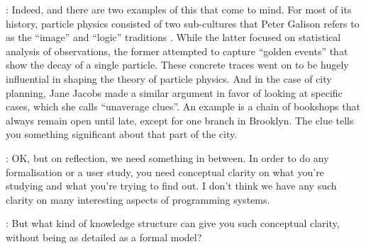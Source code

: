 \documentclass[runningheads]{llncs}
\newcommand{\T}{Tomas}
\newcommand{\J}{Joel}
\newcommand{\says}[2][gg]{\vspace{0.5em}\noindent\hangindent=0.5cm{\textsc{#1}}: #2}
\begin{document}
\says[\T]{Indeed, and there are two examples of this that come to mind. For most of its history, particle physics consisted of two sub-cultures that Peter Galison refers to as the ``image'' and ``logic'' traditions \cite{galison-1997-image}. While the latter focused on statistical analysis of observations, the former attempted to capture ``golden events'' that show the decay of a single particle. These concrete traces went on to be hugely influential in shaping the theory of particle physics. And in the case of city planning, Jane Jacobs made a similar argument \cite{jacobs-1961-death} in favor of looking at specific cases, which she calls ``unaverage clues''. An example is a chain of bookshops that always remain open until late, except for one branch in Brooklyn. The clue tells you something significant about that part of the city.}

\says[\J]{OK, but on reflection, we need something in between. In order to do any formalisation or a user study, you need conceptual clarity on what you're studying and what you're trying to find out. I don't think we have any such clarity on many interesting aspects of programming systems.}

\says[\T]{But what kind of knowledge structure can give you such conceptual clarity, without being as detailed as a formal model?}
\end{document}
